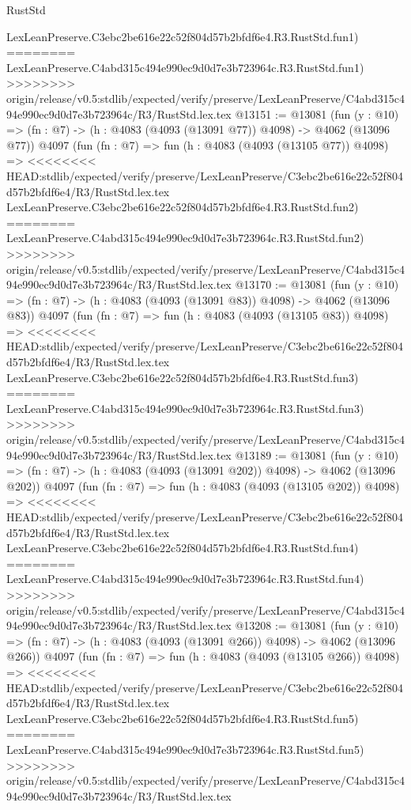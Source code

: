 \begin{lexlean}{RustStd}
\begin{coremodule}
{\begin{coremodule}
{{{{{{{{{{{{{{    LexLeanPreserve.C3ebc2be616e22c52f804d57b2bfdf6e4.R3.RustStd.fun1)
========
    LexLeanPreserve.C4abd315c494e990ec9d0d7e3b723964c.R3.RustStd.fun1)
>>>>>>>> origin/release/v0.5:stdlib/expected/verify/preserve/LexLeanPreserve/C4abd315c494e990ec9d0d7e3b723964c/R3/RustStd.lex.tex
@13151 := @13081
    (fun (y : @10) => (fn : @7) -> (h : @4083 (@4093 (@13091 @77)) @4098) -> @4062 (@13096 @77))
    @4097
    (fun (fn : @7) =>
    fun (h : @4083 (@4093 (@13105 @77)) @4098) =>
<<<<<<<< HEAD:stdlib/expected/verify/preserve/LexLeanPreserve/C3ebc2be616e22c52f804d57b2bfdf6e4/R3/RustStd.lex.tex
    LexLeanPreserve.C3ebc2be616e22c52f804d57b2bfdf6e4.R3.RustStd.fun2)
========
    LexLeanPreserve.C4abd315c494e990ec9d0d7e3b723964c.R3.RustStd.fun2)
>>>>>>>> origin/release/v0.5:stdlib/expected/verify/preserve/LexLeanPreserve/C4abd315c494e990ec9d0d7e3b723964c/R3/RustStd.lex.tex
@13170 := @13081
    (fun (y : @10) => (fn : @7) -> (h : @4083 (@4093 (@13091 @83)) @4098) -> @4062 (@13096 @83))
    @4097
    (fun (fn : @7) =>
    fun (h : @4083 (@4093 (@13105 @83)) @4098) =>
<<<<<<<< HEAD:stdlib/expected/verify/preserve/LexLeanPreserve/C3ebc2be616e22c52f804d57b2bfdf6e4/R3/RustStd.lex.tex
    LexLeanPreserve.C3ebc2be616e22c52f804d57b2bfdf6e4.R3.RustStd.fun3)
========
    LexLeanPreserve.C4abd315c494e990ec9d0d7e3b723964c.R3.RustStd.fun3)
>>>>>>>> origin/release/v0.5:stdlib/expected/verify/preserve/LexLeanPreserve/C4abd315c494e990ec9d0d7e3b723964c/R3/RustStd.lex.tex
@13189 := @13081
    (fun (y : @10) => (fn : @7) -> (h : @4083 (@4093 (@13091 @202)) @4098) -> @4062 (@13096 @202))
    @4097
    (fun (fn : @7) =>
    fun (h : @4083 (@4093 (@13105 @202)) @4098) =>
<<<<<<<< HEAD:stdlib/expected/verify/preserve/LexLeanPreserve/C3ebc2be616e22c52f804d57b2bfdf6e4/R3/RustStd.lex.tex
    LexLeanPreserve.C3ebc2be616e22c52f804d57b2bfdf6e4.R3.RustStd.fun4)
========
    LexLeanPreserve.C4abd315c494e990ec9d0d7e3b723964c.R3.RustStd.fun4)
>>>>>>>> origin/release/v0.5:stdlib/expected/verify/preserve/LexLeanPreserve/C4abd315c494e990ec9d0d7e3b723964c/R3/RustStd.lex.tex
@13208 := @13081
    (fun (y : @10) => (fn : @7) -> (h : @4083 (@4093 (@13091 @266)) @4098) -> @4062 (@13096 @266))
    @4097
    (fun (fn : @7) =>
    fun (h : @4083 (@4093 (@13105 @266)) @4098) =>
<<<<<<<< HEAD:stdlib/expected/verify/preserve/LexLeanPreserve/C3ebc2be616e22c52f804d57b2bfdf6e4/R3/RustStd.lex.tex
    LexLeanPreserve.C3ebc2be616e22c52f804d57b2bfdf6e4.R3.RustStd.fun5)
========
    LexLeanPreserve.C4abd315c494e990ec9d0d7e3b723964c.R3.RustStd.fun5)
>>>>>>>> origin/release/v0.5:stdlib/expected/verify/preserve/LexLeanPreserve/C4abd315c494e990ec9d0d7e3b723964c/R3/RustStd.lex.tex
}}}}}}}}}}}}}}
\end{coremodule}}
\end{coremodule}
\end{lexlean}
